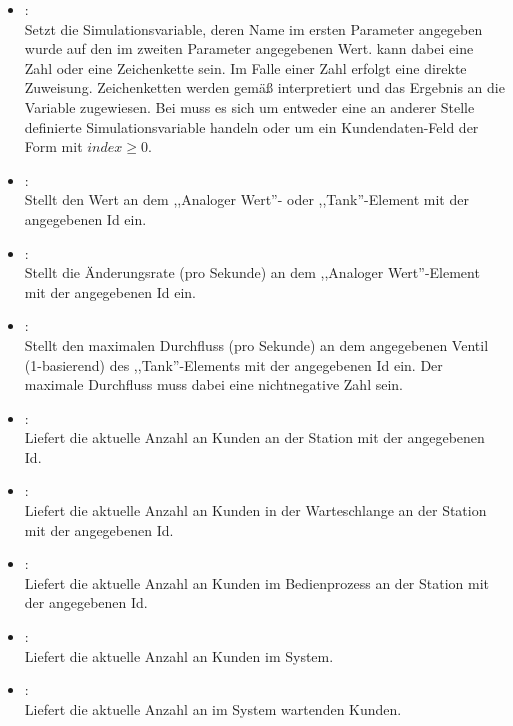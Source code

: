 \begin{itemize}

\item
{}:\\
Setzt die Simulationsvariable, deren Name im ersten Parameter angegeben wurde auf den im zweiten Parameter angegebenen Wert.
 kann dabei eine Zahl oder eine Zeichenkette sein. Im Falle einer Zahl erfolgt eine direkte Zuweisung.
Zeichenketten werden gemäß  interpretiert und das Ergebnis an die Variable zugewiesen. Bei 
muss es sich um entweder eine an anderer Stelle definierte Simulationsvariable handeln oder um ein Kundendaten-Feld der Form
 mit $index\ge0$. 
  
\item
{}:\\
Stellt den Wert an dem ,,Analoger Wert''- oder ,,Tank''-Element mit der angegebenen Id ein.
  
\item
{}:\\
Stellt die Änderungsrate (pro Sekunde) an dem ,,Analoger Wert''-Element mit der angegebenen Id ein.
  
\item
{}:\\
Stellt den maximalen Durchfluss (pro Sekunde) an dem angegebenen Ventil (1-basierend) des ,,Tank''-Elements mit der angegebenen Id ein.
Der maximale Durchfluss muss dabei eine nichtnegative Zahl sein. 
  
\item
{}:\\
Liefert die aktuelle Anzahl an Kunden an der Station mit der angegebenen Id.
  
\item
{}:\\
Liefert die aktuelle Anzahl an Kunden in der Warteschlange an der Station mit der angegebenen Id.

\item
{}:\\
Liefert die aktuelle Anzahl an Kunden im Bedienprozess an der Station mit der angegebenen Id.

\item
{}:\\
Liefert die aktuelle Anzahl an Kunden im System.
  
\item
{}:\\
Liefert die aktuelle Anzahl an im System wartenden Kunden.

\end{itemize}

